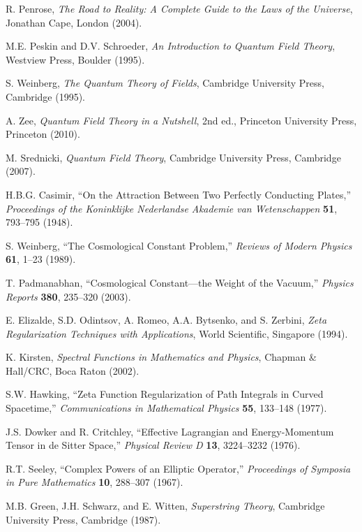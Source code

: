 \documentclass[12pt,a4paper]{article}
\begin{document}
\begin{thebibliography}{99}
 R. Penrose, \emph{The Road to Reality: A Complete Guide to the Laws of the Universe}, Jonathan Cape, London (2004).

 M.E. Peskin and D.V. Schroeder, \emph{An Introduction to Quantum Field Theory}, Westview Press, Boulder (1995).

 S. Weinberg, \emph{The Quantum Theory of Fields}, Cambridge University Press, Cambridge (1995).

 A. Zee, \emph{Quantum Field Theory in a Nutshell}, 2nd ed., Princeton University Press, Princeton (2010).

 M. Srednicki, \emph{Quantum Field Theory}, Cambridge University Press, Cambridge (2007).

 H.B.G. Casimir, ``On the Attraction Between Two Perfectly Conducting Plates,'' \emph{Proceedings of the Koninklijke Nederlandse Akademie van Wetenschappen} \textbf{51}, 793--795 (1948).

 S. Weinberg, ``The Cosmological Constant Problem,'' \emph{Reviews of Modern Physics} \textbf{61}, 1--23 (1989).

 T. Padmanabhan, ``Cosmological Constant—the Weight of the Vacuum,'' \emph{Physics Reports} \textbf{380}, 235--320 (2003).

 E. Elizalde, S.D. Odintsov, A. Romeo, A.A. Bytsenko, and S. Zerbini, \emph{Zeta Regularization Techniques with Applications}, World Scientific, Singapore (1994).

 K. Kirsten, \emph{Spectral Functions in Mathematics and Physics}, Chapman \& Hall/CRC, Boca Raton (2002).

 S.W. Hawking, ``Zeta Function Regularization of Path Integrals in Curved Spacetime,'' \emph{Communications in Mathematical Physics} \textbf{55}, 133--148 (1977).

 J.S. Dowker and R. Critchley, ``Effective Lagrangian and Energy-Momentum Tensor in de Sitter Space,'' \emph{Physical Review D} \textbf{13}, 3224--3232 (1976).

 R.T. Seeley, ``Complex Powers of an Elliptic Operator,'' \emph{Proceedings of Symposia in Pure Mathematics} \textbf{10}, 288--307 (1967).

 M.B. Green, J.H. Schwarz, and E. Witten, \emph{Superstring Theory}, Cambridge University Press, Cambridge (1987).


\end{thebibliography}
\end{document}
